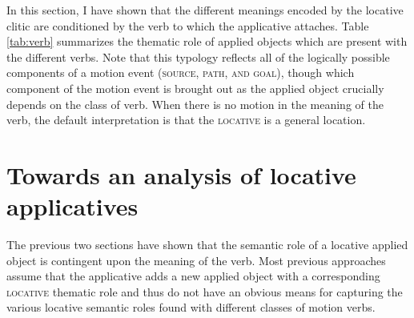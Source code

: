 \documentclass[output=paper]{langsci/langscibook}
\begin{document}
In this section, I have shown that the different meanings encoded by the locative clitic are conditioned by the verb to which the applicative attaches. Table \ref{tab:verb} summarizes the thematic role of applied objects which are present with the different verbs. Note that this typology reflects all of the logically possible components of a motion event ({\scshape source, path, and goal}), though which component of the motion event is brought out as the applied object crucially depends on the class of verb. When there is no motion in the meaning of the verb, the default interpretation is that the {\scshape locative} is a general location. 

\begin{table}
\caption{ {Verb classes and corresponding applied object meaning}} 
	
\label{tab:verb} 

\end{table}








\section{Towards an analysis of locative applicatives}%

\label{sec:jerro:5}

The previous two sections have shown that the semantic role of a locative applied object is contingent upon the meaning of the verb. Most previous approaches assume that the applicative adds a new applied object with a corresponding {\scshape locative} thematic role and thus do not have an obvious means for capturing the various locative semantic roles found with different classes of motion verbs.
\end{document}
